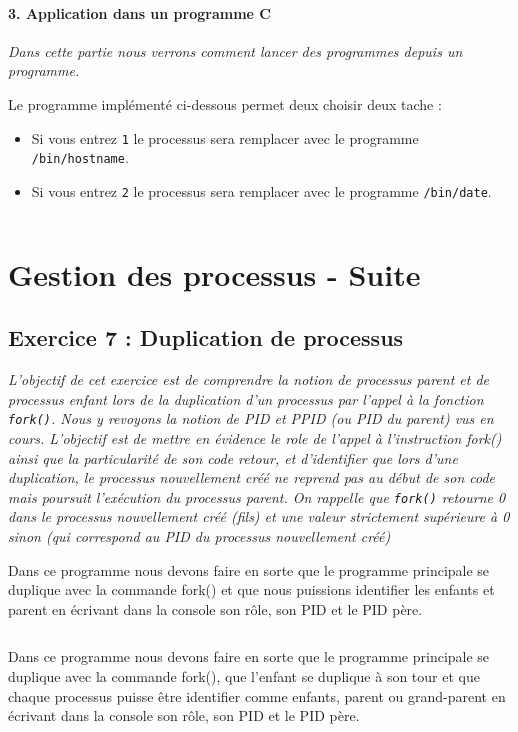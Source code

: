 \paragraph{3. Application dans un programme C}
\textit{Dans cette partie nous verrons comment lancer  des programmes depuis un programme.}

Le programme implémenté ci-dessous permet deux choisir deux tache :
\begin{itemize}
\item Si vous entrez \texttt{1} le processus sera remplacer avec le programme \texttt{/bin/hostname}.
\item Si vous entrez \texttt{2} le processus sera remplacer avec le programme \texttt{/bin/date}.
\end{itemize}

\inputminted[linenos,firstline=8, lastline=23]{cpp}{../sources/cpp/TP5-6/ex6.c}

\section{Gestion des processus - Suite}
\subsection{Exercice 7 : Duplication de processus}
\textit{L’objectif de cet exercice est de comprendre la notion de processus parent et de processus enfant lors de la duplication d’un processus par l’appel à la fonction \texttt{fork()}. Nous y revoyons la notion de PID et PPID (ou PID du parent) vus en cours. L’objectif est de mettre en évidence le role de l’appel à l’instruction fork() ainsi que la particularité de son code retour, et d’identifier que lors d’une duplication, le processus nouvellement créé ne reprend pas au début de son code mais poursuit l’exécution du processus parent. On rappelle que \texttt{fork()} retourne 0 dans le processus nouvellement créé (fils) et une valeur strictement supérieure à 0 sinon (qui correspond au PID du processus nouvellement créé)}

Dans ce programme nous devons faire en sorte que le programme principale se duplique avec la commande fork() et que nous puissions identifier les enfants et parent en écrivant dans la console son rôle, son PID et le PID père.

\inputminted[linenos,firstline=9, lastline=27]{cpp}{../sources/cpp/TP5-6/ex7-fork1.c}

Dans ce programme nous devons faire en sorte que le programme principale se duplique avec la commande fork(), que l'enfant se duplique à son tour et que chaque processus puisse être identifier comme enfants, parent ou grand-parent en écrivant dans la console son rôle, son PID et le PID père.

